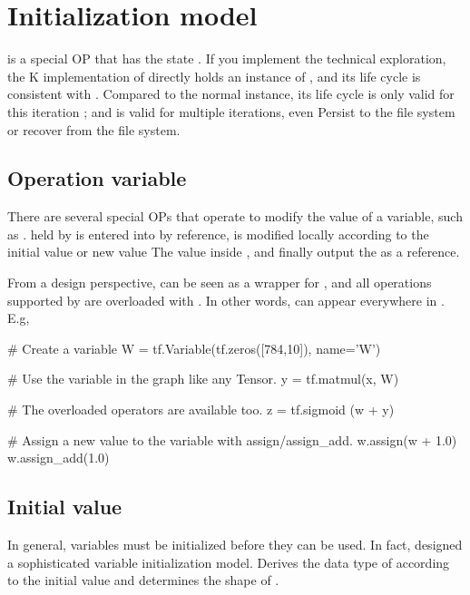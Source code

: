 \section{Initialization model}
\begin{content}
 is a special OP that has the state . If you implement the technical exploration, the K implementation of  directly holds an instance of , and its life cycle is consistent with . Compared to the normal  instance, its life cycle is only valid for this iteration ; and  is valid for multiple iterations, even Persist to the file system or recover from the file system.


\subsection{Operation variable}
There are several special OPs that operate  to modify the value of a variable, such as .  held by  is entered into  by reference,  is modified locally according to the initial value  or new value The value inside , and finally output the  as a reference.

From a design perspective,  can be seen as a wrapper for , and all operations supported by  are overloaded with . In other words,  can appear everywhere in . E.g,

\begin{leftbar}
\begin{python}
# Create a variable
W = tf.Variable(tf.zeros([784,10]), name='W')

# Use the variable in the graph like any Tensor.
y = tf.matmul(x, W)

# The overloaded operators are available too.
z = tf.sigmoid (w + y)

# Assign a new value to the variable with assign/assign\_add.
w.assign(w + 1.0)
w.assign_add(1.0)
\end{python}
\end{leftbar}


\subsection{Initial value}
In general, variables must be initialized before they can be used. In fact,  designed a sophisticated variable initialization model.  Derives the data type of  according to the initial value  and determines the shape  of .


\end{content}
